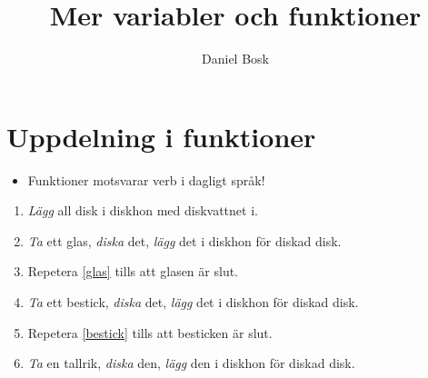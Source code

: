 \title{%
  Mer variabler och funktioner
}
\author{Daniel Bosk}


\mode*

\begin{abstract}
  
\end{abstract}


\section{Uppdelning i funktioner}

\begin{frame}
  \begin{remark}
    \begin{itemize}
      \item Funktioner motsvarar verb i dagligt språk!
    \end{itemize}
  \end{remark}
\end{frame}

\begin{frame}
  \begin{example}
    \begin{enumerate}
      \item \emph{Lägg} all disk i diskhon med diskvattnet i.
      \item \label{glas} \emph{Ta} ett glas, \emph{diska} det, \emph{lägg} det 
        i diskhon för diskad disk.
      \item Repetera \ref{glas} tills att glasen är slut.
      \item \label{bestick} \emph{Ta} ett bestick, \emph{diska} det, 
        \emph{lägg} det i diskhon för diskad disk.
      \item Repetera \ref{bestick} tills att besticken är slut.
      \item \emph{Ta} en tallrik, \emph{diska} den, \emph{lägg} den i diskhon 
        för diskad disk.
    \end{enumerate}
  \end{example}
\end{frame}

